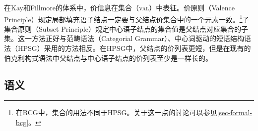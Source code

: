 在Kay和Fillmore的体系中，价信息在集合（\textsc{val}）中表征。价原则（Valence Principle）规定局部填充语子结点一定要与父结点价集合中的一个元素一致。\footnote{%
  在BCG中，集合的用法不同于HPSG。关于这一点的讨论可以参见\ref{sec-formal-bcg}。%
}子集合原则（Subset Principle）规定中心语子结点的集合值是父结点对应集合的子集。这一方法正好与范畴语法\indexcg（Categorial Grammar）、中心词驱动的短语结构语法\indexhpsg（HPSG）采用的方法相反。在HPSG中，父结点的价列表更短，但是在现有的伯克利构式语法中父结点与中心语子结点的价列表至少是一样长的。

\subsection{语义}

